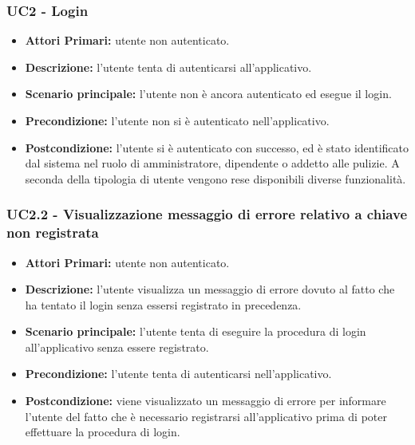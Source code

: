 \subsubsection{ UC2 - Login}
\begin{itemize}
           	\item\textbf{Attori Primari:} utente non autenticato.
           	\item\textbf{Descrizione:} l’utente tenta di autenticarsi all'applicativo.
           	\item\textbf{Scenario principale:} l’utente non è ancora autenticato ed esegue il login.
           	\item\textbf{Precondizione:} l’utente non si è autenticato nell'applicativo. 
           	\item\textbf{Postcondizione:} l’utente si è autenticato con successo, ed è stato identificato dal sistema
           	nel ruolo di amministratore, dipendente o addetto alle pulizie. A seconda della tipologia di utente vengono rese
           	disponibili diverse funzionalità.
\end{itemize}

\subsubsection{ UC2.2 - Visualizzazione messaggio di errore relativo a chiave non registrata}
\begin{itemize}
	\item\textbf{Attori Primari:} utente non autenticato.
	\item\textbf{Descrizione:} l'utente visualizza un messaggio di errore dovuto al fatto che ha tentato il login senza essersi registrato in precedenza.
	\item\textbf{Scenario principale:} l’utente tenta di eseguire la procedura di login all'applicativo senza essere registrato.
	\item\textbf{Precondizione:} l'utente tenta di autenticarsi nell'applicativo.
	\item\textbf{Postcondizione:} viene visualizzato un messaggio di errore per informare l'utente del fatto che è necessario registrarsi
	all'applicativo prima di poter effettuare la procedura di login.
\end{itemize}
